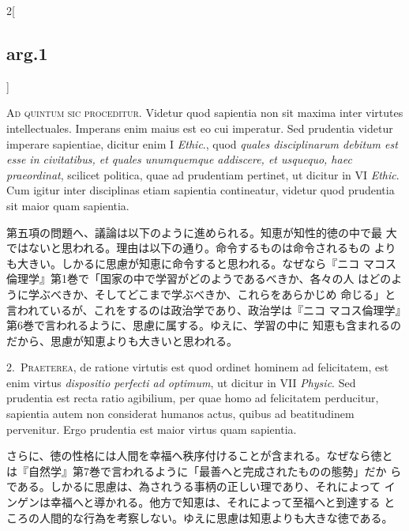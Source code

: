 \documentclass[paper=a4paper,fontsize=10pt,jafontsize=9pt,titlepage]{jlreq}
\begin{document}
\begin{paracol}{2}[\subsection{arg.1}]

{\scshape Ad quintum sic proceditur}. Videtur quod sapientia non sit
maxima inter virtutes intellectuales. Imperans enim maius est eo cui
imperatur. Sed prudentia videtur imperare sapientiae, dicitur enim I
{\itshape Ethic}., quod {\itshape quales disciplinarum debitum est
esse in civitatibus, et quales unumquemque addiscere, et usquequo,
haec praeordinat}, scilicet politica, quae ad prudentiam pertinet, ut
dicitur in VI {\itshape Ethic}. Cum igitur inter disciplinas etiam
sapientia contineatur, videtur quod prudentia sit maior quam
sapientia.

\switchcolumn

第五項の問題へ、議論は以下のように進められる。知恵が知性的徳の中で最
 大ではないと思われる。理由は以下の通り。命令するものは命令されるもの
 よりも大きい。しかるに思慮が知恵に命令すると思われる。なぜなら『ニコ
 マコス倫理学』第1巻で「国家の中で学習がどのようであるべきか、各々の人
 はどのように学ぶべきか、そしてどこまで学ぶべきか、これらをあらかじめ
 命じる」と言われているが、これをするのは政治学であり、政治学は『ニコ
 マコス倫理学』第6巻で言われるように、思慮に属する。ゆえに、学習の中に
 知恵も含まれるのだから、思慮が知恵よりも大きいと思われる。


2.~{\scshape Praeterea}, de ratione virtutis est quod ordinet hominem
ad felicitatem, est enim virtus {\itshape dispositio perfecti ad
optimum}, ut dicitur in VII {\itshape Physic}. Sed prudentia est recta
ratio agibilium, per quae homo ad felicitatem perducitur, sapientia
autem non considerat humanos actus, quibus ad beatitudinem
pervenitur. Ergo prudentia est maior virtus quam sapientia.

\switchcolumn

さらに、徳の性格には人間を幸福へ秩序付けることが含まれる。なぜなら徳と
は『自然学』第7巻で言われるように「最善へと完成されたものの態勢」だか
らである。しかるに思慮は、為されうる事柄の正しい理であり、それによって
インゲンは幸福へと導かれる。他方で知恵は、それによって至福へと到達する
ところの人間的な行為を考察しない。ゆえに思慮は知恵よりも大きな徳である。


\end{paracol}
\end{document}
